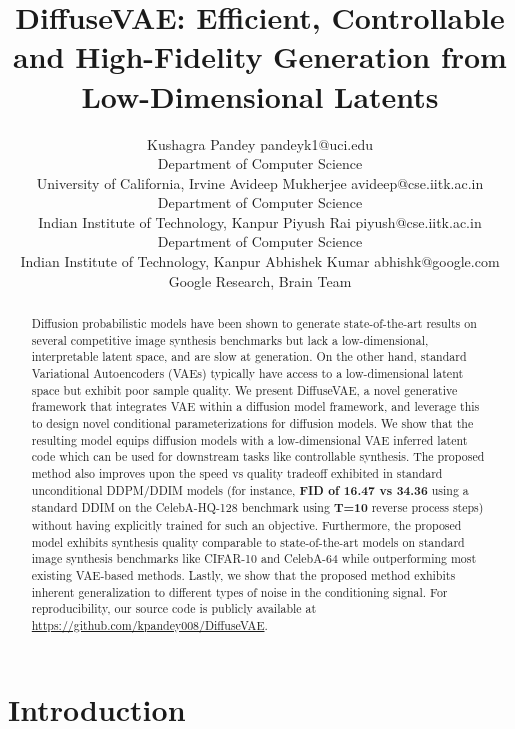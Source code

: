 \documentclass[10pt]{article} \usepackage[accepted]{tmlr}
\title{DiffuseVAE: Efficient, Controllable and High-Fidelity Generation from Low-Dimensional Latents}
\author{\name Kushagra Pandey \email pandeyk1@uci.edu \\
      \addr Department of Computer Science\\
      University of California, Irvine
      \AND
      \name Avideep Mukherjee \email avideep@cse.iitk.ac.in \\
      \addr Department of Computer Science\\
      Indian Institute of Technology, Kanpur
      \AND
      \name Piyush Rai \email piyush@cse.iitk.ac.in\\
      \addr Department of Computer Science\\
      Indian Institute of Technology, Kanpur
      \AND
      \name Abhishek Kumar \email abhishk@google.com\\
      \addr Google Research, Brain Team}
\begin{document}
\maketitle

\begin{abstract}
Diffusion probabilistic models have been shown to generate state-of-the-art results on several competitive image synthesis benchmarks but lack a low-dimensional, interpretable latent space, and are slow at generation. On the other hand, standard Variational Autoencoders (VAEs) typically have access to a low-dimensional latent space but exhibit poor sample quality. We present DiffuseVAE, a novel generative framework that integrates VAE within a diffusion model framework, and leverage this to design novel conditional parameterizations for diffusion models. We show that the resulting model equips diffusion models with a low-dimensional VAE inferred latent code which can be used for downstream tasks like controllable synthesis. The proposed method also improves upon the speed vs quality tradeoff exhibited in standard unconditional DDPM/DDIM models (for instance, \textbf{FID of 16.47 vs 34.36} using a standard DDIM on the CelebA-HQ-128 benchmark using \textbf{T=10} reverse process steps) without having explicitly trained for such an objective. Furthermore, the proposed model exhibits synthesis quality comparable to state-of-the-art models on standard image synthesis benchmarks like CIFAR-10 and CelebA-64 while outperforming most existing VAE-based methods. Lastly, we show that the proposed method exhibits inherent generalization to different types of noise in the conditioning signal. For reproducibility, our source code is publicly available at \url{https://github.com/kpandey008/DiffuseVAE}.
\end{abstract}



\section{Introduction}
\label{sec:intro}
\end{document}

